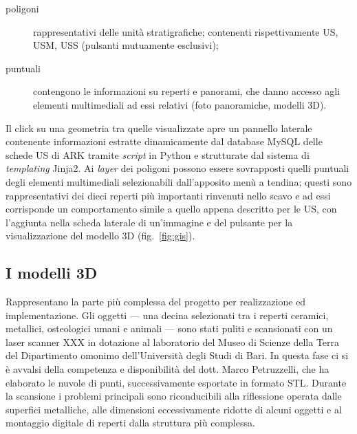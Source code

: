 \documentclass{paper}
\let\footnote\footnoteA
\begin{document}
        \begin{description}
            \item[poligoni] rappresentativi delle unità stratigrafiche; contenenti rispettivamente US, USM, USS (pulsanti mutuamente esclusivi);
            \item[puntuali] contengono le informazioni su reperti e panorami, che danno accesso agli elementi multimediali ad essi relativi (foto panoramiche, modelli 3D).
        \end{description}

        Il click su una geometria tra quelle visualizzate apre un pannello laterale contenente informazioni estratte dinamicamente dal database MySQL delle schede US di ARK tramite \textit{script} in Python e strutturate dal sistema di \textit{templating} Jinja2\footnote{\url{http://jinja.pocoo.org/docs}.}. Ai \textit{layer} dei poligoni possono essere sovrapposti quelli puntuali degli elementi multimediali selezionabili dall'apposito menù a tendina; questi sono rappresentativi dei dieci reperti più importanti rinvenuti nello scavo e ad essi corrisponde un comportamento simile a quello appena descritto per le US, con l'aggiunta nella scheda laterale di un'immagine e del pulsante per la visualizzazione del modello 3D (fig.~\ref{fig:gis}).

    \subsection{I modelli 3D}

        Rappresentano la parte più complessa del progetto per realizzazione ed implementazione. Gli oggetti --- una decina selezionati tra i reperti ceramici, metallici, osteologici umani e animali --- sono stati puliti e scansionati con un laser scanner XXX in dotazione al laboratorio del Museo di Scienze della Terra del Dipartimento omonimo dell'Università degli Studi di Bari. In questa fase ci si è avvalsi della competenza e disponibilità del dott. Marco Petruzzelli, che ha elaborato le nuvole di punti, successivamente esportate in formato STL. Durante la scansione i problemi principali sono riconducibili alla riflessione operata dalle superfici metalliche, alle dimensioni eccessivamente ridotte di alcuni oggetti e al montaggio digitale di reperti dalla struttura più complessa.\\
        
\end{document}

